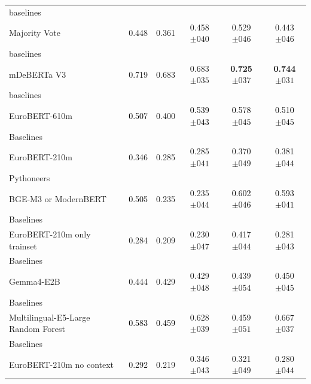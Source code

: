 \begin{tabularx}{\textwidth}{X | c c c c c}
baselines\\\subcatarrow{}Majority Vote & \textcolor{White!50!NavyBlue}{0.448} & \textcolor{White!50!NavyBlue}{0.361} & \textcolor{White!50!NavyBlue}{0.458$\pm{}040$} & \textcolor{White!50!NavyBlue}{0.529$\pm{}046$} & \textcolor{White!50!NavyBlue}{0.443$\pm{}046$} \\
baselines\\\subcatarrow{}mDeBERTa V3 & \textcolor{White!50!BrickRed}{0.719} & \textcolor{White!50!BrickRed}{0.683} & \textcolor{White!50!BrickRed}{0.683$\pm{}035$} & \textbf{\textcolor{White!50!BrickRed}{0.725$\pm{}037$}} & \textbf{\textcolor{White!50!BrickRed}{0.744$\pm{}031$}} \\
baselines\\\subcatarrow{}EuroBERT-610m & \textcolor{Black}{0.507} & \textcolor{White!50!NavyBlue}{0.400} & \textcolor{Black}{0.539$\pm{}043$} & \textcolor{Black}{0.578$\pm{}045$} & \textcolor{Black}{0.510$\pm{}045$} \\
Baselines\\\subcatarrow{}EuroBERT-210m & \textcolor{NavyBlue}{0.346} & \textcolor{NavyBlue}{0.285} & \textcolor{NavyBlue}{0.285$\pm{}041$} & \textcolor{NavyBlue}{0.370$\pm{}049$} & \textcolor{White!50!NavyBlue}{0.381$\pm{}044$} \\
Pythoneers\\\subcatarrow{}BGE-M3 or ModernBERT & \textcolor{Black}{0.505} & \textcolor{NavyBlue}{0.235} & \textcolor{NavyBlue}{0.235$\pm{}044$} & \textcolor{Black}{0.602$\pm{}046$} & \textcolor{Black}{0.593$\pm{}041$} \\
Baselines\\\subcatarrow{}EuroBERT-210m only trainset & \textcolor{NavyBlue}{0.284} & \textcolor{NavyBlue}{0.209} & \textcolor{NavyBlue}{0.230$\pm{}047$} & \textcolor{White!50!NavyBlue}{0.417$\pm{}044$} & \textcolor{NavyBlue}{0.281$\pm{}043$} \\
Baselines\\\subcatarrow{}Gemma4-E2B & \textcolor{White!50!NavyBlue}{0.444} & \textcolor{White!50!NavyBlue}{0.429} & \textcolor{White!50!NavyBlue}{0.429$\pm{}048$} & \textcolor{White!50!NavyBlue}{0.439$\pm{}054$} & \textcolor{White!50!NavyBlue}{0.450$\pm{}045$} \\
Baselines\\\subcatarrow{}Multilingual-E5-Large Random Forest & \textcolor{Black}{0.583} & \textcolor{Black}{0.459} & \textcolor{White!50!BrickRed}{0.628$\pm{}039$} & \textcolor{White!50!NavyBlue}{0.459$\pm{}051$} & \textcolor{White!50!BrickRed}{0.667$\pm{}037$} \\
Baselines\\\subcatarrow{}EuroBERT-210m no context & \textcolor{NavyBlue}{0.292} & \textcolor{NavyBlue}{0.219} & \textcolor{White!50!NavyBlue}{0.346$\pm{}043$} & \textcolor{NavyBlue}{0.321$\pm{}049$} & \textcolor{NavyBlue}{0.280$\pm{}044$} \\
\hline
\end{tabularx}